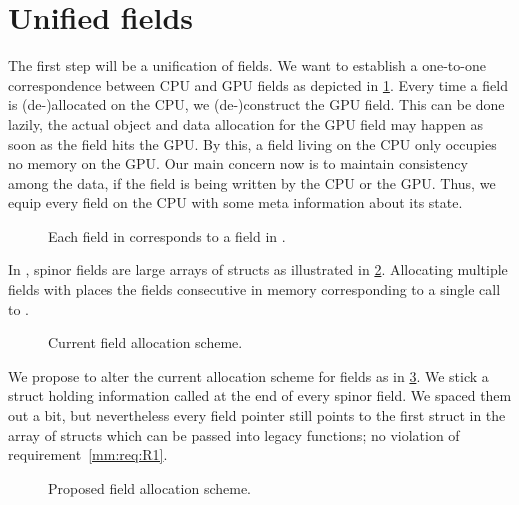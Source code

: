 \section{Unified fields}
\label{sec:mm:unified:fields}

The first step will be a unification of fields.
We want to establish a one-to-one correspondence between CPU and GPU fields as depicted in \cref{fig:mm:field0:correspondence}.
Every time a field is (de-)allocated on the CPU, we (de-)construct the GPU field.
This can be done lazily, \ie the actual object and data allocation for the GPU field may happen as soon as the field hits the GPU.
By this, a field living on the CPU only occupies no memory on the GPU.
Our main concern now is to maintain consistency among the data, if the field is being written by the CPU or the GPU.
Thus, we equip every field on the CPU with some meta information about its state.

\begin{figure}
  
  \caption{Each field in \openqxd corresponds to a field in \quda.}
  \label{fig:mm:field0:correspondence}
\end{figure}

In \openqxd, spinor fields are large arrays of structs as illustrated in \cref{fig:mm:field1:current_scheme}.
Allocating multiple fields with  places the fields consecutive in memory corresponding to a single call to .

\begin{figure}
  
  \caption{Current field allocation scheme.}
  \label{fig:mm:field1:current_scheme}
\end{figure}

We propose to alter the current allocation scheme for fields as in \cref{fig:mm:field2:proposed_scheme}.
We stick a struct holding information called  at the end of every spinor field.
We spaced them out a bit, but nevertheless every field pointer still points to the first struct in the array of structs which can be passed into legacy functions; no violation of requirement~\ref{mm:req:R1}.

\begin{figure}
  
  \caption{Proposed field allocation scheme.}
  \label{fig:mm:field2:proposed_scheme}
\end{figure}

